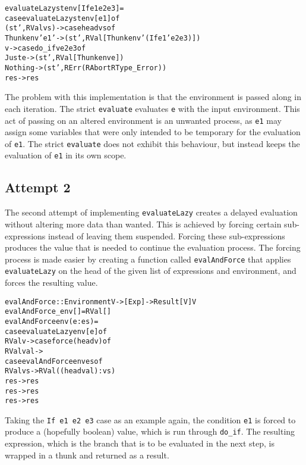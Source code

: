 \begin{alltt}
  evaluateLazy st env [If e1 e2 e3]   =
    case evaluateLazy st env [e1] of
      (st', RVal vs)   -> case head vs of
        Thunk env' e1' -> (st', RVal [Thunk env' (If e1' e2 e3)])
        v              -> case do_if v e2 e3 of
          Just e  -> (st', RVal [Thunk env e])
          Nothing -> (st', RErr (RAbort RType_Error))
      res -> res
\end{alltt}

The problem with this implementation is that the environment is passed along
in each iteration. The strict \texttt{evaluate} evaluates \texttt{e} with
the input environment. This act of passing on an altered environment is an
unwanted process, as \texttt{e1} may assign some variables that were only
intended to be temporary for the evaluation of \texttt{e1}. The strict
\texttt{evaluate} does not exhibit this behaviour, but instead keeps the
evaluation of \texttt{e1} in its own scope.

\subsection{Attempt 2}
\label{lazySem:att2}
The second attempt of implementing \texttt{evaluateLazy} creates a
delayed evaluation without altering more data than wanted. This
is achieved by forcing certain sub-expressions instead of leaving them
suspended. Forcing these sub-expressions produces the value that is needed
to continue the evaluation process. The forcing process is made easier by
creating a function called \texttt{evalAndForce} that applies
\texttt{evaluateLazy} on the head of the given list of expressions and
environment, and forces the resulting value.

\begin{alltt}
  evalAndForce :: Environment V -> [Exp] -> Result [V] V
  evalAndForce _env []    = RVal []
  evalAndForce env (e:es) =
    case evaluateLazy env [e] of
      RVal v -> case force (head v) of
        RVal val ->
          case evalAndForce env es of
            RVal vs -> RVal ((head val):vs)
            res -> res
        res -> res
      res -> res
\end{alltt}

Taking the \texttt{If e1 e2 e3} case as an example again, the condition
\texttt{e1} is forced to produce a (hopefully boolean) value, which is run
through \texttt{do\_if}. The resulting expression, which is the branch that is
to be evaluated in the next step, is wrapped in a thunk and returned as a
result.


